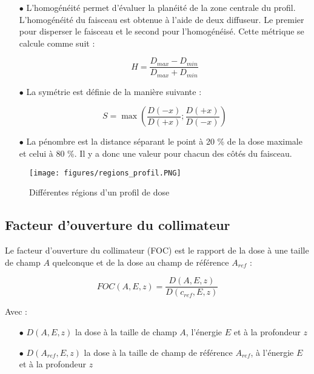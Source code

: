 \documentclass{article}
\begin{document}
\begin{itemize}
  \item[$\bullet$] L'homogénéité permet d'évaluer la planéité de la zone centrale du profil. L'homogénéité du faisceau est obtenue à l'aide de deux diffuseur. Le premier pour disperser le faisceau et le second pour l'homogénéisé. Cette métrique se calcule comme suit :
  
  \begin{equation}
    H = \dfrac{D_{max} - D_{min}}{D_{max} + D_{min}}
    \label{eq_homogeneite}
  \end{equation}
  
  \item[$\bullet$] La symétrie est définie de la manière suivante :
  
  \begin{equation}
    S = \max\left(\dfrac{D(-x)}{D(+x)}; \dfrac{D(+x)}{D(-x)}\right)
    \label{eq_symetrie}
  \end{equation}
  
  \item[$\bullet$] La pénombre est la distance séparant le point à 20 \% de la dose maximale et celui à 80 \%. Il y a donc une valeur pour chacun des côtés du faisceau.  
\end{itemize}

\begin{figure}[h]
  \centering
  \texttt{[image: figures/regions\_profil.PNG]}
  \caption{Différentes régions d'un profil de dose}
  \label{fig_regions_profil}
\end{figure}

\subsection{Facteur d'ouverture du collimateur}

Le facteur d'ouverture du collimateur (FOC) est le rapport de la dose à une taille de champ $A$ quelconque et de la dose au champ de référence $A_{ref}$ :

\begin{equation}
    FOC(A, E, z) = \dfrac{D(A, E, z)}{D(c_{ref}, E, z)}
    \label{eq_foc}
\end{equation}

Avec :

\begin{itemize}
    \item[$\bullet$] $D(A, E, z)$ la dose à la taille de champ $A$, l'énergie $E$ et à la profondeur $z$
    \item[$\bullet$] $D(A_{ref}, E, z)$ la dose à la taille de champ de référence $A_{ref}$, à l'énergie $E$ et à la profondeur $z$
\end{itemize}
\end{document}
